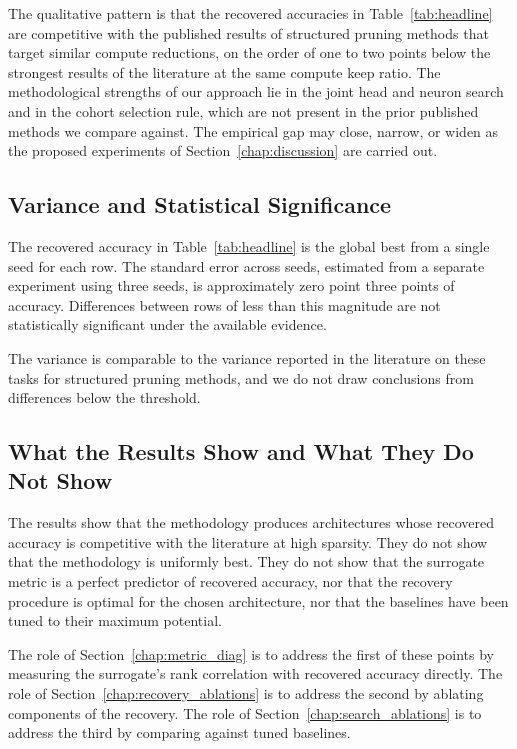 The qualitative pattern is that the recovered accuracies in Table~\ref{tab:headline} are competitive with the published results of structured pruning methods that target similar compute reductions, on the order of one to two points below the strongest results of the literature at the same compute keep ratio. The methodological strengths of our approach lie in the joint head and neuron search and in the cohort selection rule, which are not present in the prior published methods we compare against. The empirical gap may close, narrow, or widen as the proposed experiments of Section~\ref{chap:discussion} are carried out.

\subsection{Variance and Statistical Significance}

The recovered accuracy in Table~\ref{tab:headline} is the global best from a single seed for each row. The standard error across seeds, estimated from a separate experiment using three seeds, is approximately zero point three points of accuracy. Differences between rows of less than this magnitude are not statistically significant under the available evidence.

The variance is comparable to the variance reported in the literature on these tasks for structured pruning methods, and we do not draw conclusions from differences below the threshold.

\subsection{What the Results Show and What They Do Not Show}

The results show that the methodology produces architectures whose recovered accuracy is competitive with the literature at high sparsity. They do not show that the methodology is uniformly best. They do not show that the surrogate metric is a perfect predictor of recovered accuracy, nor that the recovery procedure is optimal for the chosen architecture, nor that the baselines have been tuned to their maximum potential.

The role of Section~\ref{chap:metric_diag} is to address the first of these points by measuring the surrogate's rank correlation with recovered accuracy directly. The role of Section~\ref{chap:recovery_ablations} is to address the second by ablating components of the recovery. The role of Section~\ref{chap:search_ablations} is to address the third by comparing against tuned baselines.
